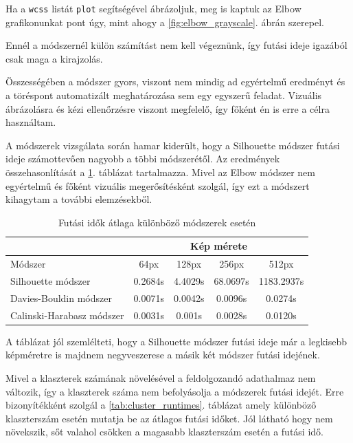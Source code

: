 Ha a \texttt{wcss} listát \texttt{plot} segítségével ábrázoljuk, meg is kaptuk az Elbow grafikonunkat pont úgy, mint ahogy a \ref{fig:elbow_grayscale}. ábrán szerepel.

Ennél a módszernél külön számítást nem kell végeznünk, így futási ideje igazából csak maga a kirajzolás.

Összességében a módszer gyors, viszont nem mindig ad egyértelmű eredményt és a töréspont automatizált meghatározása sem egy egyszerű feladat. Vizuális ábrázolásra és kézi ellenőrzésre viszont megfelelő, így főként én is erre a célra használtam.


A módszerek vizsgálata során hamar kiderült, hogy a Silhouette módszer futási ideje számottevően nagyobb a többi módszerétől. Az eredmények összehasonlítását a \ref{tab:size_runtimes}. táblázat tartalmazza. Mivel az Elbow módszer nem egyértelmű és főként vizuális megerősítésként szolgál, így ezt a módszert kihagytam a további elemzésekből.

\begin{table}[h]
\centering
\caption{Futási idők átlaga különböző módszerek esetén}
\label{tab:size_runtimes}
\medskip
\begin{tabular}{|l|c|c|c|c|}
\cline{2-5}
 \multicolumn{1}{c|}{} & \multicolumn{4}{c|}{Kép mérete} \\
 \hline
 Módszer & 64px & 128px & 256px & 512px \\
\hline
Silhouette módszer & 0.2684s & 4.4029s & 68.0697s & 1183.2937s \\
Davies-Bouldin módszer & 0.0071s & 0.0042s & 0.0096s & 0.0274s \\
Calinski-Harabasz módszer & 0.0031s & 0.001s & 0.0028s & 0.0120s \\
\hline
\end{tabular}
\end{table}

A táblázat jól szemlélteti, hogy a Silhouette módszer futási ideje már a legkisebb képméretre is majdnem negyveszerese a másik két módszer futási idejének.

Mivel a klaszterek számának növelésével a feldolgozandó adathalmaz nem változik, így a klaszterek száma nem befolyásolja a módszerek futási idejét. Erre bizonyítékként szolgál a \ref{tab:cluster_runtimes}. táblázat amely különböző klaszterszám esetén mutatja be az átlagos futási időket. Jól látható hogy nem növekszik, sőt valahol csökken a magasabb klaszterszám esetén a futási idő.

